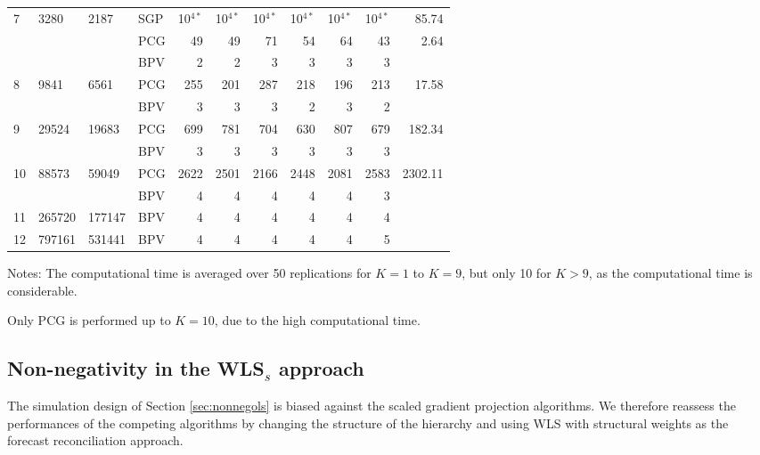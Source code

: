 \documentclass[11pt]{article}
\newcommand{\0}{\phantom{0}}
\begin{document}
\begin{table}[ht]
\begin{threeparttable}
\begin{tabular}{llllrrrrrrr}
			\midrule
			7 & 3280 & 2187 & SGP & 10$^{4*}$ & 10$^{4*}$ & 10$^{4*}$ & 10$^{4*}$ & 10$^{4*}$ & 10$^{4*}$ & 85.74\\
			& & & PCG & 49 & 49 & 71 & 54 & 64 & 43 & 2.64 \\
			& & & BPV & 2 & 2 & 3 & 3 & 3 & 3 & \pmb{$0.31$} \\
			\midrule
			8 & 9841 & 6561 & PCG & 255 & 201 & 287 & 218 & 196 & 213 & 17.58 \\
			& & & BPV & 3 & 3 & 3 & 2 & 3 & 2 & \pmb{$1.13$} \\
			\midrule
			9 & 29524 & 19683 & PCG & 699 & 781 & 704 & 630 & 807 & 679 & 182.34 \\	
			& & & BPV & 3 & 3 & 3 & 3 & 3 & 3 & \pmb{$2.80$} \\	
			\midrule	
			10 & 88573 & 59049 & PCG & 2622 & 2501 & 2166 & 2448 & 2081 & 2583 & 2302.11 \\
			& & & BPV & 4 & 4 & 4 & 4 & 4 & 3 & \pmb{$9.33$} \\
			\midrule
			11 & 265720 & 177147 & BPV & 4 & 4 & 4 & 4 & 4 & 4 & \pmb{$28.99$}\\
			\midrule
			12 & 797161 & 531441 & BPV & 4 & 4 & 4 & 4 & 4 & 5 & \pmb{$98.57$}\\
			\bottomrule
		\end{tabular}
		\begin{tablenotes} 
			\item [] Notes: The computational time is averaged over 50 replications for $K = 1$ to $K = 9$, but only 10 for $K > 9$, as the computational time is considerable.
			\item [] Only PCG is performed up to $K = 10$, due to the high computational time.	
		\end{tablenotes}
	\end{threeparttable}
\end{table}

\clearpage

\subsection{Non-negativity in the WLS$_{s}$ approach}
\label{sec:nonnegwls}
The simulation design of Section \ref{sec:nonnegols} is biased against the scaled gradient projection algorithms. We therefore reassess the performances of the competing algorithms by changing the structure of the hierarchy and using WLS with structural weights as the forecast reconciliation approach. 
\end{document}
